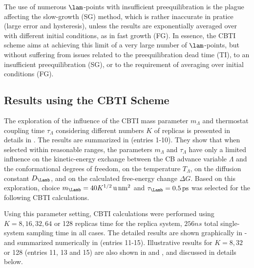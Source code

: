 The use of numerous $\lam$-points with insufficient preequilibration is the plague affecting 
the slow-growth (SG) method\cite{BE85.3,ST86.1}, which is rather inaccurate in 
pratice\cite{PE89.1,HE91.1,MA94.12} (large error and hysteresis), unless the results are exponentially 
averaged over  with different  initial conditions,
as in fast growth\cite{JA97.3,CR00.2,HE01.4,HU02.2} (FG). 
%
In essence, the CBTI scheme aims at achieving this limit of a very large number of $\lam$-points, 
but without suffering from issues related to the preequilibration dead time (TI),
to an insufficient preequilibration (SG), or to the requirement of  averaging over initial conditions (FG).
%



\subsection{Results using the CBTI Scheme}

The exploration of the influence of the CBTI 
mass parameter $m_\Lambda$ and thermostat coupling 
time $\tau_\Lambda$ considering different numbers $K$ 
of replicas is presented in details in . The results are summarized in  (entries 1-10).
%
They show that when selected within reasonable ranges,
the parameters $m_\Lambda$ and $\tau_{\Lambda}$ have only a limited 
influence on the kinetic-energy exchange between the CB advance variable
$\Lambda$ and the conformational degrees of freedom, on the 
temperature $T_\Lambda$, on the diffusion constant $D_{\Lamb}$, and on the 
calculated free-energy change $\Delta G$.
%
Based on this exploration, 
choice
$m_{\Lamb}=40 K^{1/2}\,\mathrm{u}\,\mathrm{nm}^2$ 
and $\tau_{\Lamb}=0.5\,\mathrm{ps}$ was selected for the following CBTI calculations.



Using this parameter setting, CBTI calculations were performed using
$K=8,16,32,64$ or 128 replicas  time for the replica system,
\ie{} $256\unit{ns}$ total single-system sampling time in all cases.
The detailed results are shown graphically in  - 
and summarized numerically in  (entries 11-15).
Illustrative results for $K=8,32$ or 128 (entries 11, 13 and 15)
are also shown in  and , and discussed in details below.

